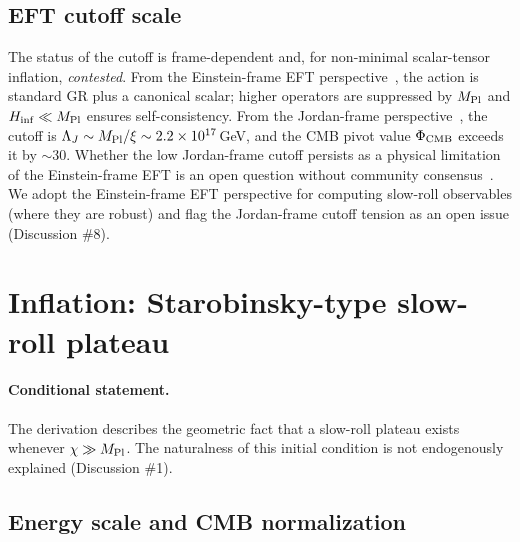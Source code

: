 \documentclass[pdflatex,sn-mathphys-num]{sn-jnl}
\newcommand{\MP}{M_{\rm Pl}}
\theoremstyle{thmstyleone}
\begin{document}
\subsection{EFT cutoff scale}

The status of the cutoff is frame-dependent and, for non-minimal scalar-tensor inflation, \emph{contested}. From the Einstein-frame EFT perspective~\cite{Bezrukov2008}, the action is standard GR plus a canonical scalar; higher operators are suppressed by $\MP$ and $H_{\rm inf}\ll\MP$ ensures self-consistency. From the Jordan-frame perspective~\cite{Burgess2009,Burgess2010}, the cutoff is $\Lambda_J\sim\MP/\xi\sim2.2\times10^{17}\,$GeV, and the CMB pivot value $\Phi_{\rm CMB}$ exceeds it by $\sim30$. Whether the low Jordan-frame cutoff persists as a physical limitation of the Einstein-frame EFT is an open question without community consensus~\cite{Flanagan2004}. We adopt the Einstein-frame EFT perspective for computing slow-roll observables (where they are robust) and flag the Jordan-frame cutoff tension as an open issue (Discussion \#8).

\section{Inflation: Starobinsky-type slow-roll plateau}

\paragraph{Conditional statement.} The derivation describes the geometric fact that a slow-roll plateau exists whenever $\chi\gg\MP$. The naturalness of this initial condition is not endogenously explained (Discussion \#1).

\subsection{Energy scale and CMB normalization}
\end{document}
